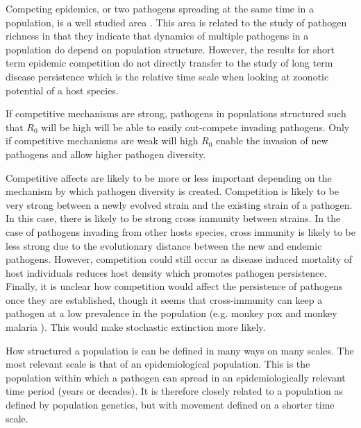 Competing epidemics, or two pathogens spreading at the same time in a population, is a well studied area \cite{poletto2013host, poletto2015characterising, karrer2011competing}. 
This area is related to the study of pathogen richness in that they indicate that dynamics of multiple pathogens in a population do depend on population structure.
However, the results for short term epidemic competition do not directly transfer to the study of long term disease persistence which is the relative time scale when looking at zoonotic potential of a host species.





If competitive mechanisms are strong, pathogens in populations structured such that $R_0$ will be high will be able to easily out-compete invading pathogens.
Only if competitive mechanisms are weak will high $R_0$  enable the invasion of new pathogens and allow higher pathogen diversity.

Competitive affects are likely to be more or less important depending on the mechanism by which pathogen diversity is created.
Competition is likely to be very strong between a newly evolved strain and the existing strain of a pathogen. 
In this case, there is likely to be strong cross immunity between strains.
In the case of pathogens invading from other hosts species, cross immunity is likely to be less strong due to the evolutionary distance between the new and endemic pathogens.
However, competition could still occur as disease induced mortality of host individuals reduces host density which promotes pathogen persistence.
Finally, it is unclear how competition would affect the persistence of pathogens once they are established, though it seems that cross-immunity can keep a pathogen at a low prevalence in the population (e.g. monkey pox \cite{rimoin2010major} and monkey malaria \cite{cox2008knowlesi}). 
This would make stochastic extinction more likely.





How structured a population is can be defined in many ways on many scales.
The most relevant scale is that of an epidemiological population.
This is the population within which a pathogen can spread in an epidemiologically relevant time period (years or decades).
It is therefore closely related to a population as defined by population genetics, but with movement defined on a shorter time scale.

